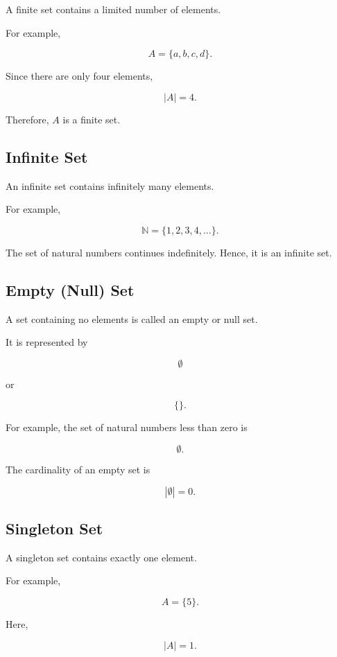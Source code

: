 \documentclass[12pt,a4paper]{article}
\begin{document}
A finite set contains a limited number of elements.

For example,

\[
A=\{a,b,c,d\}.
\]

Since there are only four elements,

\[
|A|=4.
\]

Therefore, $A$ is a finite set.


\subsection{Infinite Set}

An infinite set contains infinitely many elements.

For example,

\[
\mathbb{N}=\{1,2,3,4,\ldots\}.
\]

The set of natural numbers continues indefinitely. Hence, it is an infinite set.


\subsection{Empty (Null) Set}

A set containing no elements is called an empty or null set.

It is represented by

\[
\emptyset
\]

or

\[
\{\}.
\]

For example, the set of natural numbers less than zero is

\[
\emptyset.
\]

The cardinality of an empty set is

\[
|\emptyset|=0.
\]


\subsection{Singleton Set}

A singleton set contains exactly one element.

For example,

\[
A=\{5\}.
\]

Here,

\[
|A|=1.
\]
\end{document}
